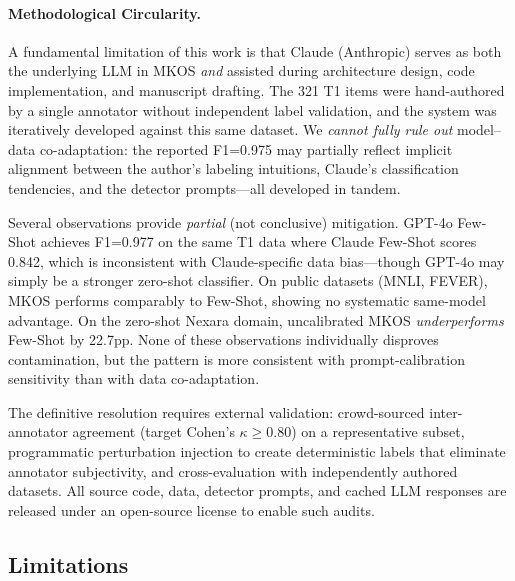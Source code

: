 \documentclass[11pt]{article}
\begin{document}
\paragraph{Methodological Circularity.} A fundamental limitation of this work is that Claude (Anthropic) serves as both the underlying LLM in MKOS \emph{and} assisted during architecture design, code implementation, and manuscript drafting. The 321 T1 items were hand-authored by a single annotator without independent label validation, and the system was iteratively developed against this same dataset. We \emph{cannot fully rule out} model--data co-adaptation: the reported F1=0.975 may partially reflect implicit alignment between the author's labeling intuitions, Claude's classification tendencies, and the detector prompts---all developed in tandem.

Several observations provide \emph{partial} (not conclusive) mitigation. GPT-4o Few-Shot achieves F1=0.977 on the same T1 data where Claude Few-Shot scores 0.842, which is inconsistent with Claude-specific data bias---though GPT-4o may simply be a stronger zero-shot classifier. On public datasets (MNLI, FEVER), MKOS performs comparably to Few-Shot, showing no systematic same-model advantage. On the zero-shot Nexara domain, uncalibrated MKOS \emph{underperforms} Few-Shot by 22.7pp. None of these observations individually disproves contamination, but the pattern is more consistent with prompt-calibration sensitivity than with data co-adaptation.

The definitive resolution requires external validation: crowd-sourced inter-annotator agreement (target Cohen's $\kappa \geq 0.80$) on a representative subset, programmatic perturbation injection to create deterministic labels that eliminate annotator subjectivity, and cross-evaluation with independently authored datasets. All source code, data, detector prompts, and cached LLM responses are released under an open-source license to enable such audits.

\subsection{Limitations}
\end{document}
